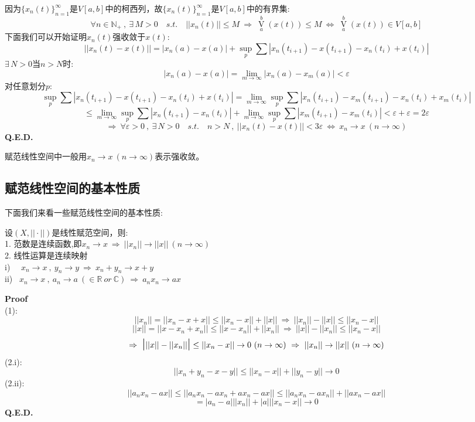 因为$\{x_n(t)\}_{n=1}^{\infty}$是$V[a,b]$中的柯西列，故$\{x_n(t)\}_{n=1}^{\infty}$是$V[a,b]$中的有界集:
\[\forall n \in \mathbb{N}_+ \ , \ \exists \, M>0 \quad s.t. \quad ||x_n(t)|| \leq M \ \Rightarrow \ \mathop \text{V}\limits_a^b(x(t)) \leq M \ \Leftrightarrow \ \mathop \text{V}\limits_a^b(x(t)) \in V[a,b]\]
下面我们可以开始证明$x_n(t)$强收敛于$x(t)$:
\[||x_n(t)-x(t)||=|x_n(a)-x(a)|+\mathop \text{sup}\limits_p \sum |x_n(t_{i+1})-x(t_{i+1})-x_n(t_i)+x(t_i)|\]
$\exists \, N>0$当$n>N$时:
\[|x_n(a)-x(a)|=\lim_{m \to \infty}|x_n(a)-x_m(a)|<\varepsilon\]
对任意划分$p$:
\[\mathop \text{sup}\limits_p \sum |x_n(t_{i+1})-x(t_{i+1})-x_n(t_i)+x(t_i)|=\lim_{m \to \infty}\mathop \text{sup}\limits_p \sum |x_n(t_{i+1})-x_m(t_{i+1})-x_n(t_i)+x_m(t_i)|\]
\[\leq \lim_{m \to \infty}\mathop \text{sup}\limits_p \sum |x_n(t_{i+1})-x_n(t_i)|+\lim_{m \to \infty}\mathop \text{sup}\limits_p \sum |x_m(t_{i+1})-x_m(t_i)|<\varepsilon+\varepsilon=2\varepsilon\]
\[\Rightarrow \ \forall \varepsilon>0 \ , \ \exists \, N>0 \quad s.t. \quad n>N \ , \ ||x_n(t)-x(t)||<3\varepsilon \ \Leftrightarrow \ x_n \to x \ (n \to \infty)\]
\textbf{Q.E.D.}

赋范线性空间中一般用$x_n \to x \ (n \to \infty)$表示强收敛。

\subsection{赋范线性空间的基本性质}
下面我们来看一些赋范线性空间的基本性质:
\begin{theorem}
    设$(X,||\cdot||)$是线性赋范空间，则:\\
    1. 范数是连续函数,即$x_n \to x \ \Rightarrow \ ||x_n|| \to ||x|| \ (n \to \infty)$\\
    2. 线性运算是连续映射\\
    i) \ \ $x_n \to x \ , \ y_n \to y \ \Rightarrow \ x_n+y_n \to x+y$\\
    ii) \ $x_n \to x \ , \ a_n \to a \ (\in \mathbb{R} \ or \ \mathbb{C}) \ \Rightarrow \ a_nx_n \to ax$
\end{theorem}
\textbf{Proof}\\
(1):
\[||x_n||=||x_n-x+x|| \leq ||x_n-x||+||x|| \ \Rightarrow \ ||x_n||-||x|| \leq ||x_n-x||\]
\[||x||=||x-x_n+x_n|| \leq ||x-x_n||+||x_n|| \ \Rightarrow \ ||x||-||x_n|| \leq ||x_n-x||\]
\[\Rightarrow \ \text{\Large|} ||x||-||x_n|| \text{\Large|} \leq ||x_n-x|| \to 0 \ (n \to \infty) \ \Rightarrow \ ||x_n|| \to ||x|| \ (n \to \infty)\]
(2.i):
\[||x_n+y_n-x-y|| \leq ||x_n-x||+||y_n-y|| \to 0\]
(2.ii):
\[||a_nx_n-ax|| \leq ||a_nx_n-ax_n+ax_n-ax|| \leq ||a_nx_n-ax_n||+||ax_n-ax||\]
\[=|a_n-a|||x_n||+|a|||x_n-x|| \to 0\]
\textbf{Q.E.D.}

